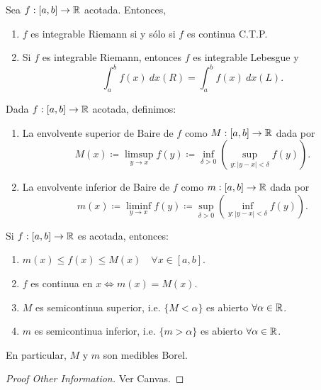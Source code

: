 \begin{theorem}
	Sea $f : [a,b] \to \mathbb{R}$ acotada. Entonces,
	\begin{enumerate}
		\item $f$ es integrable Riemann si y sólo si $f$ es continua C.T.P.

		\item Si $f$ es integrable Riemann, entonces $f$ es integrable Lebesgue y
		\[ \int_{a}^{b} f(x) \ dx(R) = \int_{a}^{b} f(x) \ dx(L). \]
	\end{enumerate}
\end{theorem}

\begin{definition}
	Dada $f : [a,b] \to \mathbb{R}$ acotada, definimos:
	\begin{enumerate}
		\item La envolvente superior de Baire de $f$ como $M : [a,b] \to \mathbb{R}$ dada por 
		\[ M(x) \coloneq \limsup_{y \to x} f(y) \coloneq \inf_{\delta > 0}\left(\sup_{y : |y - x| < \delta} f(y)\right). \]

		\item La envolvente inferior de Baire de $f$ como $m : [a,b] \to \mathbb{R}$ dada por
		\[ m(x) \coloneq \liminf_{y \to x} f(y) \coloneq \sup_{\delta > 0} \left(\inf_{y : |y - x| < \delta} f(y) \right). \]
	\end{enumerate}
\end{definition}

\begin{lemma}
	Si $f : [a,b] \to \mathbb{R}$ es acotada, entonces:
	\begin{enumerate}
		\item $m(x) \leq f(x) \leq M(x) \quad \forall x \in [a,b]$.

		\item $f$ es continua en $x \iff m(x) = M(x)$.

		\item $M$ es semicontinua superior, i.e. $\{M < \alpha\}$ es abierto $\forall \alpha \in \mathbb{R}$.

		\item $m$ es semicontinua inferior, i.e. $\{m > \alpha\}$ es abierto $\forall \alpha \in \mathbb{R}$. 
	\end{enumerate}
	En particular, $M$ y $m$ son medibles Borel.
\end{lemma}
\begin{proof}[Proof Other Information]
	Ver Canvas.
\end{proof}

